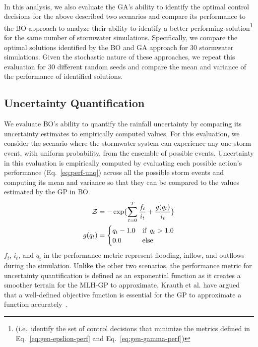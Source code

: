 \

In this analysis, we also evaluate the GA's ability to identify the optimal control decisions for the above described two scenarios and compare its performance to the BO approach to analyze their ability to identify a better performing solution\footnote{(i.e.\ identify the set of control decisions that minimize the metrics defined in Eq.~\ref{eq:gen-epslion-perf} and Eq.~\ref{eq:gen-gamma-perf})} for the same number of stormwater simulations.
Specifically, we compare the optimal solutions identified by the BO and GA approach for 30 stormwater simulations.
Given the stochastic nature of these approaches, we repeat this evaluation for 30 different random seeds and compare the mean and variance of the performance of identified solutions.



\subsection{Uncertainty Quantification}\label{sec:unq}
We evaluate BO's ability to quantify the rainfall uncertainty by comparing its uncertainty estimates to empirically computed values.
For this evaluation, we consider the scenario where the stormwater system can experience any one storm event, with uniform probability, from the ensemble of possible events.
Uncertainty in this evaluation is empirically computed by evaluating  each possible action's performance (Eq.~\ref{eq:perf-unq}) across all the possible storm events and computing its mean and variance so that they can be compared to the values estimated by the GP in BO.
\begin{subequations}\label{eq:perf-unq}
\begin{align}
	\mathcal{Z} &= - \exp\{ \sum_{t=0}^T  \frac{f_t}{i_t} + \frac{g(q_{t})}{i_t} \} \\
	g(q_{t}) &=
      \begin{cases}
        q_{t} - 1.0
                   & \text{if \,} q_{t} > 1.0 \\
	      0.0     & \text{else}
      \end{cases}
\end{align}
\end{subequations}
$f_t$, $i_t$, and $q_t$ in the performance metric represent flooding, inflow, and outflows during the simulation.
Unlike the other two scenarios, the performance metric for uncertainty quantification is defined as an exponential function as it creates a smoother terrain for the MLH-GP to approximate.
Krauth et al. have argued that a well-defined objective function is essential for the GP to approximate a function accurately~\cite{Krauth_Bonilla_Cutajar_Filippone}.

